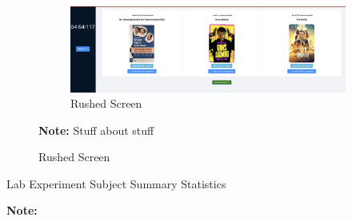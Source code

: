 \documentclass[12pt,letterpaper]{article}
\begin{document}
\begin{figure}[ht]
\begin{subfigure}{.5\textwidth}
         \label{fig:lab_rush_instructions}
    \end{subfigure}
     \begin{subfigure}{.5\textwidth}
       \centering
        \includegraphics[width=1\linewidth]{Misc Screenshots/RushedScreenShot.png}  
        \caption{Rushed Screen}
         \label{fig:lab_rush_screenshot}
    \end{subfigure}

\footnotesize \textbf{Note:} Stuff about stuff
\end{figure}


\begin{table}[]
    \caption{Lab Experiment Subject Summary Statistics}
    \begin{center}
    \label{tab:samplab}
    \end{center}
\footnotesize \textbf{Note:} 
\end{table}

\end{document}
